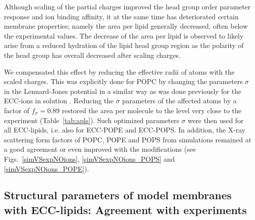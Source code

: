Although scaling of the partial charges improved 
the head group order parameter response and ion binding affinity,
it at the same time has deteriorated certain membrane properties; 
namely the area per lipid generally decreased, often below the experimental values. 
The decrease of the area per lipid is observed to likely arise from a reduced hydration of the lipid head group region
as the polarity of the head group has overall decreased after scaling charges. 

We compensated this effect
by reducing the effective radii of atoms with the scaled charges.
This was explicitly done for POPC by changing the parameters $\sigma$ in the Lennard-Jones potential 
in a similar way as was done previously for the ECC-ions in solution \cite{kohagen14,kohagen16,Pluharova2014}.
Reducing the $\sigma$ parameters of the affected atoms by a factor of $f_\sigma = 0.89$
restored the area per molecule to the level very close to the experiment (Table~\ref{tab:apls}). 
Such optimized parameters $\sigma$ were then used for all ECC-lipids, i.e. also for ECC-POPE and ECC-POPS. 
In addition, the X-ray scattering form factors of POPC, POPE and POPS from simulations remained at a good agreement or even improved with the modifications 
(see Figs.~\ref{simVSexpNOions}, \ref{simVSexpNOions_POPS} and \ref{simVSexpNOions_POPE}). 








\subsection{Structural parameters of model membranes with ECC-lipids: Agreement with experiments} 
 
